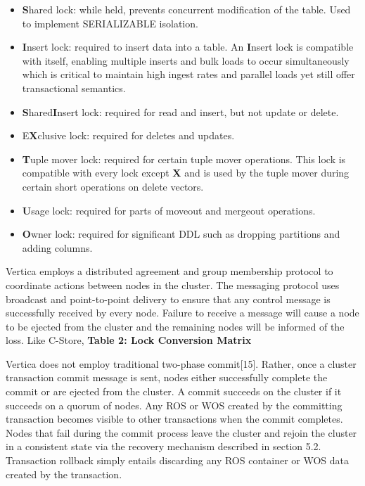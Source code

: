 \documentclass[a4paper,12pt,notitlepage,twoside,openright]{article}
\begin{document}
\begin{itemize}
\item

  \textbf{S}hared lock: while held, prevents concurrent modification of
  the table. Used to implement SERIALIZABLE isolation.

\item

  \textbf{I}nsert lock: required to insert data into a table. An
  \textbf{I}nsert lock is compatible with itself, enabling multiple
  inserts and bulk loads to occur simultaneously which is critical to
  maintain high ingest rates and parallel loads yet still offer
  transactional semantics.

\item

  \textbf{S}hared\textbf{I}nsert lock: required for read and insert, but
  not update or delete.

\item

  E\textbf{X}clusive lock: required for deletes and updates.

\item

  \textbf{T}uple mover lock: required for certain tuple mover
  operations. This lock is compatible with every lock except \textbf{X}
  and is used by the tuple mover during certain short operations on
  delete vectors.

\item

  \textbf{U}sage lock: required for parts of moveout and mergeout
  operations.

\item

  \textbf{O}wner lock: required for significant DDL such as dropping
  partitions and adding columns.

\end{itemize}

Vertica employs a distributed agreement and group membership protocol to
coordinate actions between nodes in the cluster. The messaging protocol
uses broadcast and point-to-point delivery to ensure that any control
message is successfully received by every node. Failure to receive a
message will cause a node to be ejected from the cluster and the
remaining nodes will be informed of the loss. Like C-Store,
\textbf{Table 2: Lock Conversion Matrix}

Vertica does not employ traditional two-phase commit{[}15{]}. Rather,
once a cluster transaction commit message is sent, nodes either
successfully complete the commit or are ejected from the cluster. A
commit succeeds on the cluster if it succeeds on a quorum of nodes. Any
ROS or WOS created by the committing transaction becomes visible to
other transactions when the commit completes. Nodes that fail during the
commit process leave the cluster and rejoin the cluster in a consistent
state via the recovery mechanism described in section 5.2. Transaction
rollback simply entails discarding any ROS container or WOS data created
by the transaction.
\end{document}
